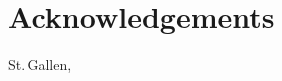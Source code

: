 

\chapter*{Acknowledgements}


\lipsum[1-3]

\vfill
\noindent
St.\,Gallen,
\makeatletter
\@degreedate{}
\hfill
\@author
\makeatother
\vfill